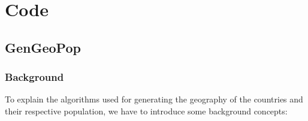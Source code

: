 \chapter{Code}
\label{chap:code}


\section{GenGeoPop}
\label{section:gengeopop}

\subsection{Background}
\label{subsection:background}

To explain the algorithms used for generating the geography of the countries and their respective population, we have to introduce some background concepts:

